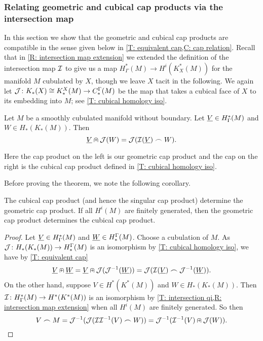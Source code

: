 \subsubsection{Relating geometric and cubical cap products via the intersection map}

In this section we show that the geometric and cubical cap products are compatible in the sense given below in \cref{T: equivalent cap,C: cap relation}.
Recall that in \cref{R: intersection map extension} we extended the definition of the intersection map $\mathcal{I}$ to give us a map $H^*_\Gamma(M) \to H^i(K_X^*(M))$ for the manifold $M$ cubulated by $X$, though we leave $X$ tacit in the following.
We again let $\mathcal{J} \colon K_*(X) \cong K^X_*(M) \to C^\Gamma_*(M)$ be the map that takes a cubical face of $X$ to its embedding into $M$; see \cref{T: cubical homology iso}.

\begin{theorem}\label{T: equivalent cap}
	Let $M$ be a smoothly cubulated manifold without boundary.
	Let $\underline{V} \in H^*_\Gamma(M)$ and $W \in H_*(K_*(M))$.
	Then
	$$\underline{V} \nplus \mathcal{J}(W) = \mathcal{J}(\mathcal{I}(\underline{V})\frown W).$$
\end{theorem}

Here the cap product on the left is our geometric cap product and the cap on the right is the cubical cap product defined in \cref{T: cubical homology iso}.

Before proving the theorem, we note the following corollary.

\begin{corollary}\label{C: cap relation}
	The cubical cap product (and hence the singular cap product) determine the geometric cap product.
	If all $H^i(M)$ are finitely generated, then the geometric cap product determines the cubical cap product.
\end{corollary}

\begin{proof}
	Let $\underline{V} \in H^*_\Gamma(M)$ and $\underline{W} \in H_*^\Gamma(M)$.
	Choose a cubulation of $M$.
	As $\mathcal{J} \colon H_*(K_*(M)) \to H_*^\Gamma(M)$ is an isomorphism by \cref{T: cubical homology iso}, we have by \cref{T: equivalent cap}
	$$\underline{V}\nplus \underline{W} = \underline{V}\nplus \mathcal{J}(\mathcal{J}^{-1}(\underline{W})) = \mathcal{J}(\mathcal{I}(\underline{V})\frown \mathcal{J}^{-1}(\underline{W})).$$
	On the other hand, suppose $V \in H^*(K^*(M))$ and $W \in H_*(K_*(M))$.
	Then $\mathcal{I} \colon H^*_\Gamma(M) \to H^*(K^*(M))$ is an isomorphism by \cref{T: intersection qi,R: intersection map extension} when all $H^i(M)$ are finitely generated.
	So then
	$$V\frown M = \mathcal{J}^{-1}(\mathcal{J}(\mathcal{I}\mathcal{I}^{-1}(V)\frown W)) = \mathcal{J}^{-1}(\mathcal{I}^{-1}(V) \nplus \mathcal{J}(W)).$$
\end{proof}


